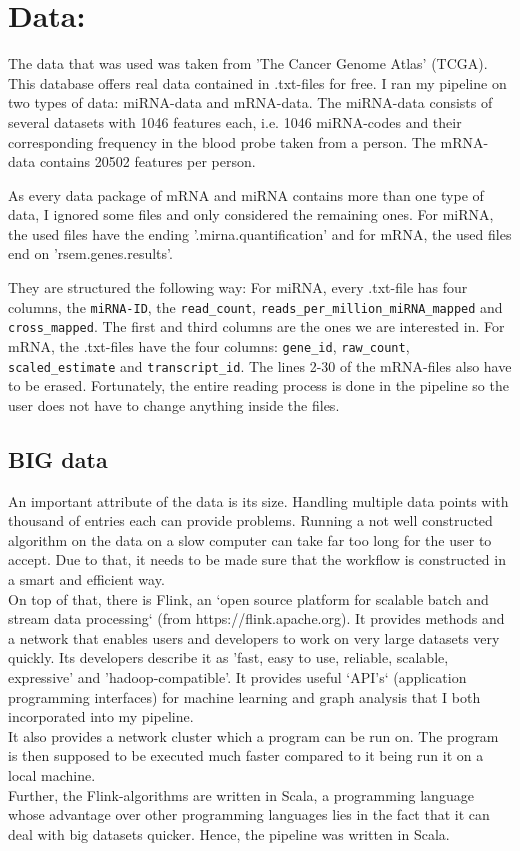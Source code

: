 \documentclass{bioinfo}
\begin{document}
 

\section{Data:}
 

The data that was used was taken from 'The Cancer Genome Atlas' (TCGA). This database offers real data contained in .txt-files for free. I ran my pipeline on two types of data: miRNA-data and mRNA-data. The miRNA-data consists of several datasets with 1046 features each, i.e. 1046 miRNA-codes and their corresponding frequency in the blood probe taken from a person. The mRNA-data contains 20502 features per person. 

As every data package of mRNA and miRNA contains more than one type of data, I ignored some files and only considered the remaining ones. For miRNA, the used files have the ending '.mirna.quantification' and for mRNA, the used files end on 'rsem.genes.results'. 

They are structured the following way: For miRNA, every .txt-file has four columns, the \texttt{miRNA-ID}, the \texttt{read\_count}, \texttt{reads\_per\_million\_miRNA\_mapped}
 and \texttt{cross\_mapped}. The first and third columns 
are the ones we are interested in. For mRNA, the 
.txt-files have the four columns: \texttt{gene\_id}, 
\texttt{raw\_count}, \texttt{scaled\_estimate} and 
\texttt{transcript\_id}. The lines 2-30 of the mRNA-files 
also have to be erased. Fortunately, the entire reading process is done in the pipeline so the user does not have to change anything inside the files. 

\subsection{BIG data}
An important attribute of the data is its size. Handling multiple data points with thousand of entries each can provide problems. Running a not well constructed algorithm on the data on a slow computer can take far too long for the user to accept. Due to that, it needs to be made sure that the workflow is constructed in a smart and efficient way.\\
On top of that, there is Flink, an `open source platform for scalable batch and stream data processing` (from https://flink.apache.org). It provides methods and a network that enables users and developers to work on very large datasets very quickly. Its developers describe it as 'fast, easy to use, reliable, scalable, expressive' and 'hadoop-compatible'. It provides useful `API's` (application programming interfaces) for machine learning and graph analysis that I both incorporated into my pipeline.\\
It also provides a network cluster which a program can be run on. The program is then supposed to be executed much faster compared to it being run it on a local machine.\\
Further, the Flink-algorithms are written in Scala, a programming language whose advantage over other programming languages lies in the fact that it can deal with big datasets quicker. Hence, the pipeline was written in Scala.\\
 
\end{document}
